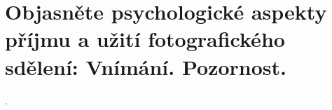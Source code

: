 \section{Objasněte psychologické aspekty příjmu a užití fotografického sdělení: Vnímání. Pozornost.}.